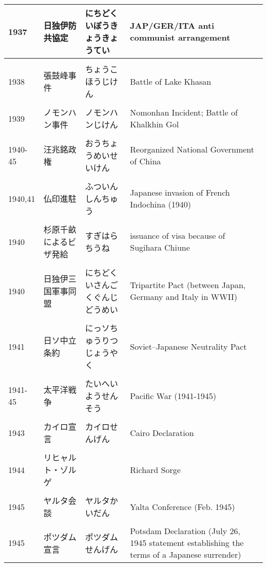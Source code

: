 \documentclass{article}
\begin{document}
\begin{tabular}{p{1.8cm} | p{3.4cm} | p{5.91cm} | p{7.0cm}}
1937    & 日独伊防共協定 & にちどくいぼうきょうきょうてい & JAP/GER/ITA anti communist arrangement \\ \hline \\[-1em]
1938    & 張鼓峰事件 & ちょうこほうじけん & Battle of Lake Khasan \\ \hline \\[-1em]
1939    & ノモンハン事件 & ノモンハンじけん & Nomonhan Incident; Battle of Khalkhin Gol \\ \hline \\[-1em]
1940-45 & 汪兆銘政権 & おうちょうめいせいけん & Reorganized National Government of China \\ \hline \\[-1em]
1940,41 & 仏印進駐 & ふついんしんちゅう & Japanese invasion of French Indochina (1940) \\ \hline \\[-1em]
1940    & 杉原千畝によるビザ発給 & すぎはらちうね & issuance of visa because of Sugihara Chiune  \\ \hline \\[-1em]
1940    & 日独伊三国軍事同盟 & にちどくいさんごくぐんじどうめい & Tripartite Pact (between Japan, Germany and Italy in WWII) \\ \hline \\[-1em]
1941    & 日ソ中立条約 & にっソちゅうりつじょうやく & Soviet–Japanese Neutrality Pact \\ \hline \\[-1em]
1941-45 & 太平洋戦争 & たいへいようせんそう & Pacific War (1941-1945) \\ \hline \\[-1em]
1943    & カイロ宣言 & カイロせんげん & Cairo Declaration \\ \hline \\[-1em]
1944    & リヒャルト・ゾルゲ &  & Richard Sorge \\ \hline \\[-1em]
1945    & ヤルタ会談 & ヤルタかいだん & Yalta Conference (Feb. 1945) \\ \hline \\[-1em]
1945    & ポツダム宣言 & ポツダムせんげん & Potsdam Declaration (July 26, 1945 statement establishing the terms of a Japanese surrender)
\end{tabular}
\end{document}
